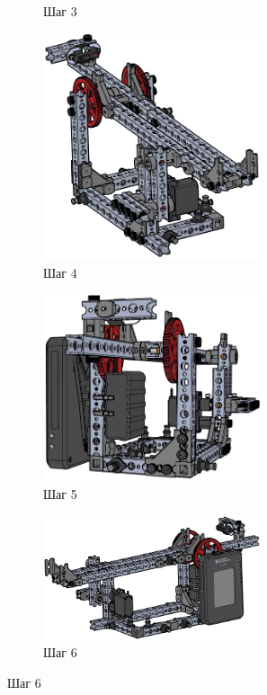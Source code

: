 \begin{figure}[h]
\begin{subfigure}[b]{0.45\textwidth}
        \caption*{Шаг 3}
    \end{subfigure}
    \begin{subfigure}[b]{0.45\textwidth}
        \centering
        \includegraphics[width=0.7\textwidth]{fig/assembly/2.4.png}
        \caption*{Шаг 4}
    \end{subfigure}
    \begin{subfigure}[b]{0.45\textwidth}
        \centering
        \includegraphics[width=0.7\textwidth]{fig/assembly/2.5.png}
        \caption*{Шаг 5}
    \end{subfigure}
    \begin{subfigure}[b]{0.45\textwidth}
        \flushright
        \includegraphics[width=0.7\textwidth]{fig/assembly/2.6.png}
        \caption*{Шаг 6}
    \end{subfigure}
\end{figure}


